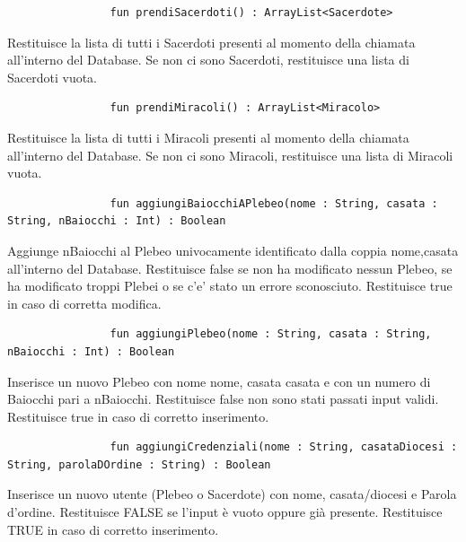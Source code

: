 \documentclass[a4paper]{report}
\begin{document}
                \begin{verbatim}
                fun prendiSacerdoti() : ArrayList<Sacerdote>
                \end{verbatim}
                Restituisce la lista di tutti i Sacerdoti presenti al momento della chiamata all'interno del Database.
                Se non ci sono Sacerdoti, restituisce una lista di Sacerdoti vuota.

                \vspace*{1cm}

                \begin{verbatim}
                fun prendiMiracoli() : ArrayList<Miracolo>
                \end{verbatim}
                Restituisce la lista di tutti i Miracoli presenti al momento della chiamata all'interno del Database.
                Se non ci sono Miracoli, restituisce una lista di Miracoli vuota.

                \vspace*{1cm}

                \begin{verbatim}
                fun aggiungiBaiocchiAPlebeo(nome : String, casata : String, nBaiocchi : Int) : Boolean
                \end{verbatim}
                Aggiunge nBaiocchi al Plebeo univocamente identificato dalla coppia {nome,casata} all'interno del Database.
                Restituisce false se non ha modificato nessun Plebeo, se ha modificato troppi Plebei o se c'e' stato un errore sconosciuto.
                Restituisce true in caso di corretta modifica.

                \vspace*{1cm}

                \begin{verbatim}
                fun aggiungiPlebeo(nome : String, casata : String, nBaiocchi : Int) : Boolean
                \end{verbatim}
                Inserisce un nuovo Plebeo con nome nome, casata casata e con un numero di Baiocchi pari a nBaiocchi.
                Restituisce false non sono stati passati input validi.
                Restituisce true in caso di corretto inserimento.

                \vspace*{1cm}

                \begin{verbatim}
                fun aggiungiCredenziali(nome : String, casataDiocesi : String, parolaDOrdine : String) : Boolean
                \end{verbatim}
                Inserisce un nuovo utente (Plebeo o Sacerdote) con nome, casata/diocesi e Parola d'ordine.
                Restituisce FALSE se l'input è vuoto oppure già presente.
                Restituisce TRUE in caso di corretto inserimento.
\end{document}
